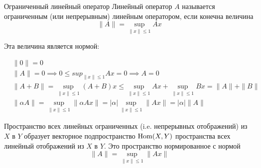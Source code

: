 \begin{dfn}{Ограниченный линейный оператор}
  Линейный оператор $A$
  называется ограниченным (или непрерывным) линейным оператором,
  если конечна величина
  $$\|A\| = \sup_{\|x\|\leq 1} A x$$

  Эта величина является нормой:

  \begin{align*}
    & \|0\| = 0 \\
    & \|A\| = 0 \implies 0\leq sup_{\|x\|\leq 1} A x = 0 \implies A = 0 \\
    & \|A + B\| = \sup_{\|x\|\leq 1} (A + B) x \leq \sup_{\|x\|\leq 1} A x + \sup_{\|x\|\leq 1} B x = \|A\| + \|B\| \\
    & \|\alpha A\| = \sup_{\|x\|\leq 1} \|\alpha A x\| = \left|\alpha\right| \sup_{\|x\|\leq 1} \|A x\| = \left|\alpha\right| \|A\|
  \end{align*}
\end{dfn}

Пространство всех линейных ограниченных (i.e. непрерывных отображений) из $X$ в $Y$
образует векторное подпространство $\mathrm{Hom}(X, Y)$
пространства всех линейный отображений из $X$ в $Y$.
Это пространство нормированное с нормой
$$\|A\| = \sup_{\|x\|\leq 1} \|A x\|$$

